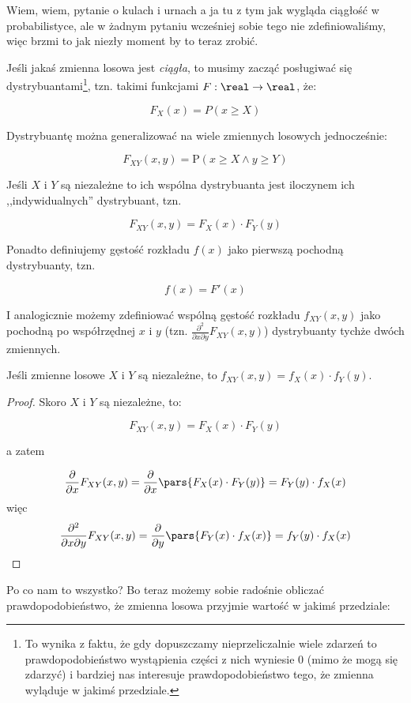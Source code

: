 Wiem, wiem, pytanie o kulach i urnach a ja tu z tym jak wygląda ciągłość w probabilistyce, ale w żadnym pytaniu wcześniej sobie tego nie zdefiniowaliśmy, więc brzmi to jak niezły moment by to teraz zrobić.

Jeśli jakaś zmienna losowa jest \textit{ciągła}, to musimy zacząć posługiwać się dystrybuantami\footnote{To wynika z faktu, że gdy dopuszczamy nieprzeliczalnie wiele zdarzeń to prawdopodobieństwo wystąpienia części z nich wyniesie 0 (mimo że mogą się zdarzyć) i bardziej nas interesuje prawdopodobieństwo tego, że zmienna wyląduje w jakimś przedziale.}, tzn. takimi funkcjami \( F: \real \rightarrow \real\), że:

\[
	F_X(x) = P(x \geq X)
\]

Dystrybuantę można generalizować na wiele zmiennych losowych jednocześnie:


\[
	F_{XY}(x,y) = \mathrm{P}(x \geq X \land y \geq Y)
\]

Jeśli \(X\) i \(Y\) są niezależne to ich wspólna dystrybuanta jest iloczynem ich ,,indywidualnych'' dystrybuant, tzn.

\[
	F_{XY}(x,y) = F_X(x) \cdot F_Y(y)
\]

Ponadto definiujemy gęstość rozkładu \(f(x)\) jako pierwszą pochodną dystrybuanty, tzn.

\[
	f(x) = F'(x)
\]

I analogicznie możemy zdefiniować wspólną gęstość rozkładu \(f_{XY}(x,y)\) jako pochodną po współrzędnej \(x\) i \(y\) (tzn. \( \frac{\partial^2}{\partial x \partial y} F_{XY}(x,y) \)) dystrybuanty tychże dwóch zmiennych.

\begin{fact}
	Jeśli zmienne losowe \(X\) i \(Y\) są niezależne, to \(f_{XY}(x,y) = f_{X}(x) \cdot f_{Y}(y)\).
\end{fact}

\begin{proof}
	Skoro \(X\) i \(Y\) są niezależne, to:

	\[
		F_{XY}(x,y) = F_{X}(x) \cdot F_{Y}(y)
	\]

	a zatem

	\[
		\frac{\partial}{\partial x} F_{XY}(x,y) = \frac{\partial}{\partial x} \pars{F_{X}(x) \cdot F_{Y}(y)} = F_{Y}(y) \cdot f_{X}(x)
	\]
	więc
	\[
		\frac{\partial^2}{\partial x \partial y} F_{XY}(x,y) = \frac{\partial}{\partial y} \pars{F_{Y}(x) \cdot f_{X}(x)} = f_{Y}(y) \cdot f_{X}(x)
	\]
\end{proof}

Po co nam to wszystko? Bo teraz możemy sobie radośnie obliczać prawdopodobieństwo, że zmienna losowa przyjmie wartość w jakimś przedziale:

